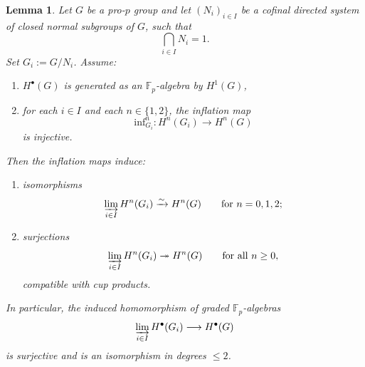 \documentclass[11pt]{amsart}
\numberwithin{equation}{section}
\newtheorem{lemma}[theorem]{Lemma}
\theoremstyle{definition}
\begin{document}
	\begin{lemma}\label{lem:cohom-colimit}
		Let \(G\) be a pro-\(p\) group and let \((N_i)_{i\in I}\) be a cofinal directed system of closed normal subgroups of \(G\), such that
		\[\bigcap_{i\in I} N_i = 1.\]
		Set \(G_i:=G/N_i\). Assume:
		\begin{enumerate}[label=(\roman*)]
			\item \(H^\bullet(G)\) is generated as an \(\mathbb{F}_p\)-algebra by \(H^1(G)\),
			\item for each \(i\in I\) and each \(n\in\{1,2\}\), the inflation map 
			\[\mathrm{inf}^n_{G_i}\colon H^n(G_i)\longrightarrow H^n(G)\]
			is injective.
		\end{enumerate}
		Then the inflation maps induce:
		\begin{enumerate}[label=(\alph*)]
			\item isomorphisms
			\[\varinjlim_{i\in I} H^n(G_i)\xrightarrow{\sim} H^n(G) \qquad \text{for } n=0,1,2;\]
			\item surjections
			\[ \varinjlim_{i\in I} H^n(G_i)\twoheadrightarrow H^n(G) \qquad \text{for all } n\ge 0,\]
			compatible with cup products.
		\end{enumerate}
		In particular, the induced homomorphism of graded \(\mathbb{F}_p\)-algebras
		\[\varinjlim_{i\in I} H^\bullet(G_i)\longrightarrow H^\bullet(G)\]
		is surjective and is an isomorphism in degrees \(\le 2\).
	\end{lemma}
	
\end{document}
